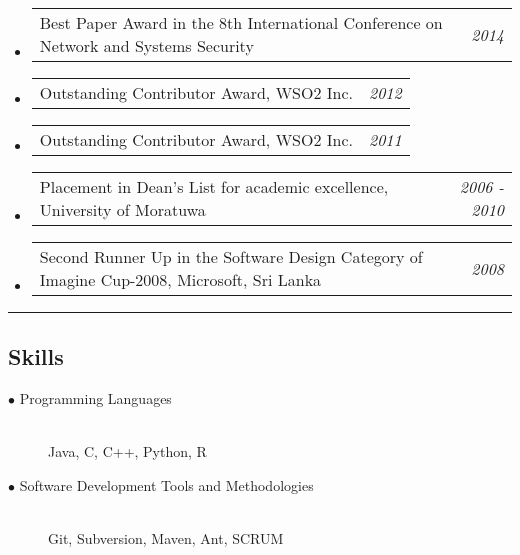 \documentclass[10pt,letterpaper]{article}
\makeatletter
\newenvironment{indentsection}[1]%
{\begin{list}{}%
	{\setlength{\leftmargin}{#1}}%
	\item[]%
}
{\end{list}}
\newcommand{\headerrow}[2]
{\begin{tabular*}{\linewidth}{l@{\extracolsep{\fill}}r}
	#1 &
	#2 \\
\end{tabular*}}
\makeatother
\begin{document}
\begin{itemize}
	\parskip=0.1em
	\item
	\headerrow{Best Paper Award in the 8th International Conference on Network and Systems Security}
	{\emph{2014}}
	\item
	\headerrow
		{Outstanding Contributor Award, WSO2 Inc.}
		{\emph{2012}}

	\item
	\headerrow
		{Outstanding Contributor Award, WSO2 Inc.}
		{\emph{2011}}
	
	\item
	\headerrow
		{Placement in Dean's List for academic excellence, University of Moratuwa}
		{\emph{2006 - 2010}}
	
	\item
	\headerrow{Second Runner Up in the Software Design Category of Imagine Cup-2008, Microsoft, Sri Lanka}
		{\emph{2008}}
 \end{itemize}


\hrule
\vspace{-0.4em}
\subsection*{Skills}
\begin{indentsection}{\parindent}
\begin{description}
	\item[$\bullet$ Programming Languages] \hfill \vspace{0.3em} \\ Java, C, C++, Python, R
	\item[$\bullet$ Software Development Tools and Methodologies] \hfill \vspace{0.3em} \\ Git, Subversion, Maven, Ant, SCRUM
\end{description}
\end{indentsection}

\end{document}
